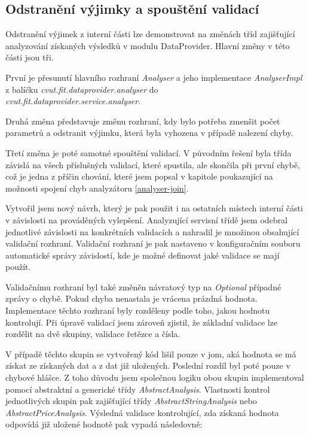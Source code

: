 \documentclass[thesis=B,czech]{FITthesis}[2012/06/26]
\begin{document}
\subsection{Odstranění výjimky a spouštění validací}
Odstranění výjimek z interní části lze demonstrovat na změnách tříd zajišťující analyzování získaných výsledků v modulu DataProvider. Hlavní změny v této části jsou tři.
\par
První je přesunutí hlavního rozhraní \textit{Analyser} a jeho implementace
\textit{AnalyserImpl} z balíčku \textit{cvut.fit.dataprovider.analyser} 
do  \\
\textit{cvut.fit.dataprovider.service.analyser}. 
\par
Druhá změna představuje změnu rozhraní, kdy bylo potřeba
zmenšit počet parametrů a odstranit výjimku, která byla vyhozena v případě nalezení chyby. 
\par
Třetí změna je poté samotné spouštění 
validací. V původním řešení byla třída závislá na všech příslušných validací, které spustila, ale skončila při první chybě, což je jedna 
z příčin chování, které jsem popsal v kapitole poukazující na možnosti spojení chyb analyzátoru \autoref{analyser-join}.
\par
Vytvořil jsem nový návrh, který je pak použit i na ostatních místech interní části v závislosti na
prováděných vylepšení. Analyzující servisní třídě jsem odebral jednotlivé závislosti na konkrétních validacích a nahradil je množinou 
obsahující validační rozhraní. Validační rozhraní je pak nastaveno v konfiguračním souboru automatické správy závislostí, kde je možné
definovat jaké validace se mají použít.
\par
Validačnímu rozhraní byl také změněn návratový typ na \textit{Optional} případné zprávy o chybě. Pokud chyba nenastala je vrácena
prázdná hodnota. Implementace těchto rozhraní byly rozděleny podle toho, jakou hodnotu kontrolují.
Při úpravě validací jsem zároveň zjistil, že základní validace lze rozdělit na dvě skupiny, validace řetězce a čísla.
\par
V případě těchto skupin se vytvořený kód lišil pouze v jom, aká hodnota se má získat ze získaných dat a z dat již uložených.
Poslední rozdíl byl poté pouze v chybové hlášce. Z toho důvodu jsem společnou logiku obou skupin implementoval
pomocí abstraktní a generické třídy \textit{AbstractAnalysis}. Vlastnosti kontrol jednotlivých skupin pak zajišťující třídy \textit{AbstractStringAnalysis} 
nebo \textit{AbstractPriceAnalysis}. Výsledná validace kontrolující, zda získaná hodnota odpovídá již uložené hodnotě pak
vypadá následovně:
\end{document}
